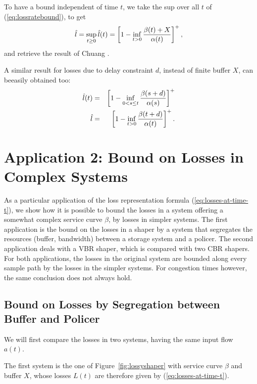 To have a bound independent of time $t$, we take the sup over all $t$ of (\ref{eq:lossratebound}),
to get
\begin{equation}
\mylabel{eq:lossratebound2}
\hat{l} = \sup_{t \geq  0} \hat{l}(t) = \left[ 1 - \inf_{t > 0} \frac{\beta(t) + X}{\alpha(t)} \right]^{+} ,
\end{equation}
and retrieve the result of Chuang \cite{Chuang}.

A similar result for losses due to delay constraint $d$, instead of finite buffer $X$,
can beeasily obtained too:
\begin{eqnarray}
\mylabel{eq:lossratedelaybound}
\hat{l}(t) & = &  \left[ 1 - \inf_{0 < s \leq t} \frac{\beta(s+d)}{\alpha(s)} \right]^{+} \\
\mylabel{eq:lossratedelaybound2}
\hat{l} & = &  \left[ 1 - \inf_{t > 0} \frac{\beta(t+d)}{\alpha(t)} \right]^{+} .
\end{eqnarray}


\section{Application 2: Bound on Losses in Complex Systems}

As a particular application  of the loss representation formula (\ref{eq:losses-at-time-t}),
we show how it is possible to bound the losses in a system offering a somewhat complex service curve $\beta$, by losses in simpler systems. The first application is the bound on the losses
in a shaper by a system that segregates the resources (buffer, bandwidth) between
a storage system and a policer. The second application deals with a VBR shaper,
which is compared with two CBR shapers. For both applications,
the losses in the original system are bounded along every sample path by the losses
in the simpler systems. For congestion times however, the same conclusion does not always
hold.


\subsection{Bound on Losses by Segregation between Buffer and Policer}

We will first compare the losses in two systems,
having the same input flow $a(t)$.

The first system is the  one of Figure~\ref{fig:lossyshaper} with
service curve $\beta$ and buffer $X$, whose losses $L(t)$
are therefore given by (\ref{eq:losses-at-time-t}).


